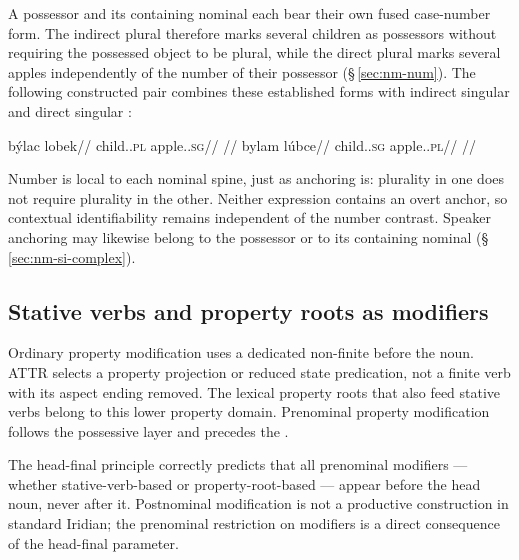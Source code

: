 A possessor and its containing nominal each bear their own fused case-number
form. The indirect plural  therefore marks several children as
possessors without requiring the possessed object to be plural, while the
direct plural  marks several apples independently of the number
of their possessor (§\,\ref{sec:nm-num}). The following constructed pair
combines these established forms with indirect singular  and
direct singular :

\pex
\a
\begingl
\gla býlac lobek//
\glb child.\Ind{}.\textsc{pl} apple.\Dir{}.\textsc{sg}//
\glft {}//
\endgl
\a
\begingl
\gla bylam lúbce//
\glb child.\Ind{}.\textsc{sg} apple.\Dir{}.\textsc{pl}//
\glft {}//
\endgl
\xe

\noindent Number is local to each nominal spine, just as anchoring is:
plurality in one does not require plurality in the other. Neither expression
contains an overt anchor, so contextual identifiability remains independent
of the number contrast. Speaker anchoring may likewise belong to the possessor
or to its containing nominal (§\,\ref{sec:nm-si-complex}).

\subsection{Stative verbs and property roots as  modifiers}
\label{sec:nm-prop}

Ordinary property modification uses a dedicated non-finite 
before the noun. ATTR selects a property projection or reduced state
predication, not a finite verb with its aspect ending removed. The lexical
property roots that also feed stative verbs belong to this lower property
domain. Prenominal property modification follows the possessive layer and
precedes the .

The head-final principle correctly predicts that all prenominal modifiers —
whether stative-verb-based or property-root-based — appear before the head noun,
never after it. Postnominal modification is not a productive construction in
standard Iridian; the prenominal restriction on modifiers is a direct
consequence of the head-final parameter.

\pex
\a {} 
\a {} 
\a {} 
\a {} 
\a {} 
\xe

